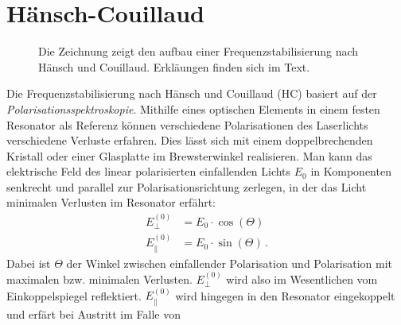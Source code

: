 \section{Hänsch-Couillaud}\label{sec:haensch-couillaud}
\begin{figure}[h]
 	\centering
	\caption[Hänsch-Couillaud - Aufbau]{Die Zeichnung zeigt den aufbau
	einer Frequenzstabilisierung nach Hänsch
	und Couillaud. Erkläungen finden sich im
	Text.}\label{fig:haensch-couillaud_aufbau}
\end{figure}
Die Frequenzstabilisierung nach Hänsch und Couillaud (HC)
basiert auf der \textit{Polarisationsspektroskopie}. Mithilfe eines
optischen Elements in einem festen Resonator als Referenz können verschiedene
Polarisationen des Laserlichts verschiedene Verluste erfahren. Dies lässt sich
mit einem doppelbrechenden Kristall oder einer Glasplatte im Brewsterwinkel
realisieren. Man kann das elektrische Feld des linear polarisierten einfallenden
Lichts $E_0$ in Komponenten senkrecht und parallel zur Polarisationsrichtung
zerlegen, in der das Licht minimalen Verlusten im Resonator erfährt:
\begin{equation}\label{eq:haensch-couillaud_01}
	\begin{split}
		E_{\perp}^{(0)} & = E_0\cdot\cos{(\Theta)}\\
		E_{\parallel}^{(0)} & = E_0\cdot\sin{(\Theta)}\,.
	\end{split}
\end{equation}
Dabei ist $\Theta$ der Winkel zwischen einfallender Polarisation und
Polarisation mit maximalen bzw. minimalen Verlusten. $E_{\perp}^{(0)}$ wird also
im Wesentlichen vom Einkoppelspiegel reflektiert. $E_{\parallel}^{(0)}$
wird hingegen in den Resonator eingekoppelt und erfärt bei Austritt im Falle von
